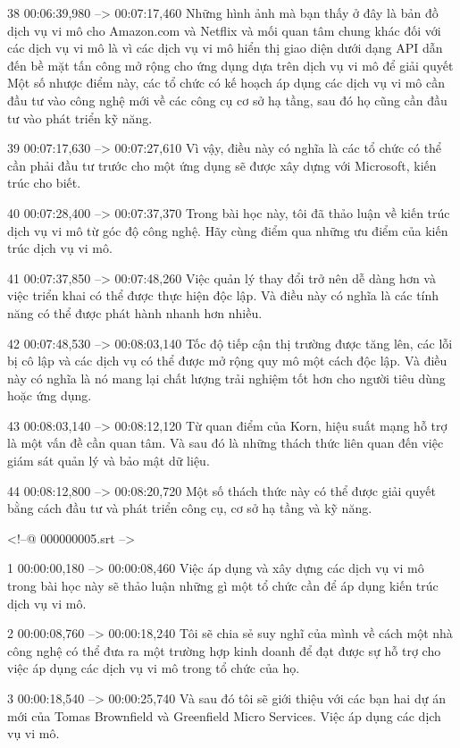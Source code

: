 38
00:06:39,980 --> 00:07:17,460
Những hình ảnh mà bạn thấy ở đây là bản đồ dịch vụ vi mô cho Amazon.com và Netflix và mối quan tâm chung khác đối với các dịch vụ vi mô là vì các dịch vụ vi mô hiển thị giao diện dưới dạng API dẫn đến bề mặt tấn công mở rộng cho ứng dụng dựa trên dịch vụ vi mô để giải quyết  Một số nhược điểm này, các tổ chức có kế hoạch áp dụng các dịch vụ vi mô cần đầu tư vào công nghệ mới về các công cụ cơ sở hạ tầng, sau đó họ cũng cần đầu tư vào phát triển kỹ năng.

39
00:07:17,630 --> 00:07:27,610
Vì vậy, điều này có nghĩa là các tổ chức có thể cần phải đầu tư trước cho một ứng dụng sẽ được xây dựng với Microsoft, kiến ​​trúc cho biết.

40
00:07:28,400 --> 00:07:37,370
Trong bài học này, tôi đã thảo luận về kiến ​​trúc dịch vụ vi mô từ góc độ công nghệ.  Hãy cùng điểm qua những ưu điểm của kiến ​​trúc dịch vụ vi mô.

41
00:07:37,850 --> 00:07:48,260
Việc quản lý thay đổi trở nên dễ dàng hơn và việc triển khai có thể được thực hiện độc lập.  Và điều này có nghĩa là các tính năng có thể được phát hành nhanh hơn nhiều.

42
00:07:48,530 --> 00:08:03,140
Tốc độ tiếp cận thị trường được tăng lên, các lỗi bị cô lập và các dịch vụ có thể được mở rộng quy mô một cách độc lập.  Và điều này có nghĩa là nó mang lại chất lượng trải nghiệm tốt hơn cho người tiêu dùng hoặc ứng dụng.

43
00:08:03,140 --> 00:08:12,120
Từ quan điểm của Korn, hiệu suất mạng hỗ trợ là một vấn đề cần quan tâm.  Và sau đó là những thách thức liên quan đến việc giám sát quản lý và bảo mật dữ liệu.

44
00:08:12,800 --> 00:08:20,720
Một số thách thức này có thể được giải quyết bằng cách đầu tư và phát triển công cụ, cơ sở hạ tầng và kỹ năng.

<!--@ 000000005.srt -->

1
00:00:00,180 --> 00:00:08,460
Việc áp dụng và xây dựng các dịch vụ vi mô trong bài học này sẽ thảo luận những gì một tổ chức cần để áp dụng kiến ​​trúc dịch vụ vi mô.

2
00:00:08,760 --> 00:00:18,240
Tôi sẽ chia sẻ suy nghĩ của mình về cách một nhà công nghệ có thể đưa ra một trường hợp kinh doanh để đạt được sự hỗ trợ cho việc áp dụng các dịch vụ vi mô trong tổ chức của họ.

3
00:00:18,540 --> 00:00:25,740
Và sau đó tôi sẽ giới thiệu với các bạn hai dự án mới của Tomas Brownfield và Greenfield Micro Services.  Việc áp dụng các dịch vụ vi mô.

